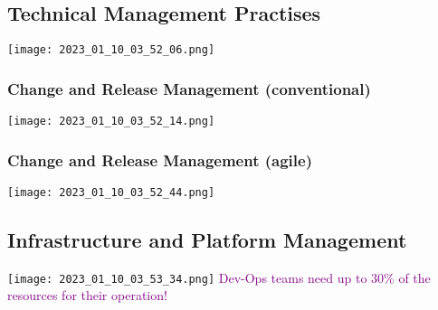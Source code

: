\documentclass[main.tex,fontsize=12pt,paper=a4,paper=landscape,DIV=calc,]{scrartcl}
\begin{document}
\begin{multicols*}{2}
\subsection{Technical Management Practises}
\texttt{[image: 2023\_01\_10\_03\_52\_06.png]}

\subsubsection{Change and Release Management (conventional)}
\texttt{[image: 2023\_01\_10\_03\_52\_14.png]}

\subsubsection{Change and Release Management (agile)}
\texttt{[image: 2023\_01\_10\_03\_52\_44.png]}

\subsection{Infrastructure and Platform Management}
\texttt{[image: 2023\_01\_10\_03\_53\_34.png]}\newline
\textcolor{purple}{Dev-Ops teams need up to 30\% of the resources for their operation!}


\end{multicols*}
\end{document}
